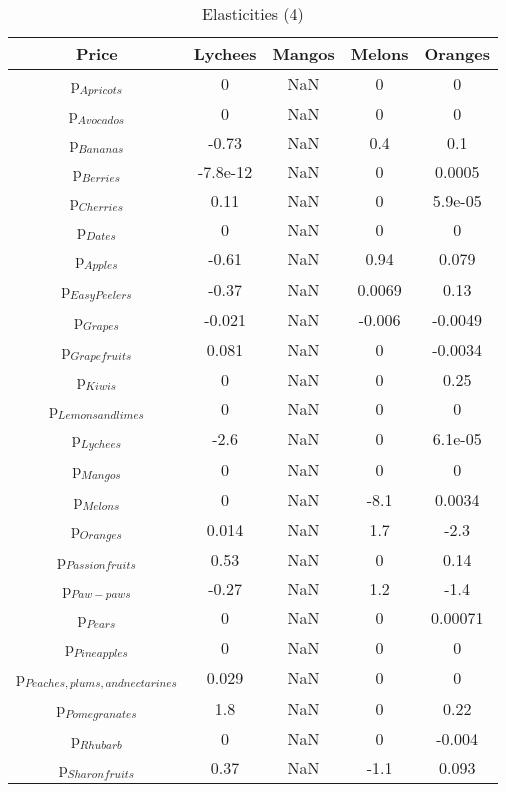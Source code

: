 \documentclass[11pt]{article}
\begin{document}
\begin{table}[h]
\caption{Elasticities (4)}
\label{Table: elasticities 4}
\begin{center}
\begin{tabular}{ccccc}
Price & Lychees & Mangos & Melons & Oranges \\ \hline
p$_{Apricots}$ & 0 & NaN & 0 & 0 \\ 
p$_{Avocados}$ & 0 & NaN & 0 & 0 \\ 
p$_{Bananas}$ & -0.73 & NaN & 0.4 & 0.1 \\ 
p$_{Berries}$ & -7.8e-12 & NaN & 0 & 0.0005 \\ 
p$_{Cherries}$ & 0.11 & NaN & 0 & 5.9e-05 \\ 
p$_{Dates}$ & 0 & NaN & 0 & 0 \\ 
p$_{Apples}$ & -0.61 & NaN & 0.94 & 0.079 \\ 
p$_{Easy Peelers}$ & -0.37 & NaN & 0.0069 & 0.13 \\ 
p$_{Grapes}$ & -0.021 & NaN & -0.006 & -0.0049 \\ 
p$_{Grapefruits}$ & 0.081 & NaN & 0 & -0.0034 \\ 
p$_{Kiwis}$ & 0 & NaN & 0 & 0.25 \\ 
p$_{Lemons and limes}$ & 0 & NaN & 0 & 0 \\ 
p$_{Lychees}$ & -2.6 & NaN & 0 & 6.1e-05 \\ 
p$_{Mangos}$ & 0 & NaN & 0 & 0 \\ 
p$_{Melons}$ & 0 & NaN & -8.1 & 0.0034 \\ 
p$_{Oranges}$ & 0.014 & NaN & 1.7 & -2.3 \\ 
p$_{Passion fruits}$ & 0.53 & NaN & 0 & 0.14 \\ 
p$_{Paw-paws}$ & -0.27 & NaN & 1.2 & -1.4 \\ 
p$_{Pears}$ & 0 & NaN & 0 & 0.00071 \\ 
p$_{Pineapples}$ & 0 & NaN & 0 & 0 \\ 
p$_{Peaches, plums, and nectarines}$ & 0.029 & NaN & 0 & 0 \\ 
p$_{Pomegranates}$ & 1.8 & NaN & 0 & 0.22 \\ 
p$_{Rhubarb}$ & 0 & NaN & 0 & -0.004 \\ 
p$_{Sharon fruits}$ & 0.37 & NaN & -1.1 & 0.093 \\ 
\end{tabular}
\end{center}
\end{table}
\end{document}
